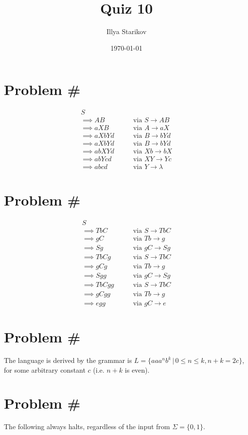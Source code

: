 \documentclass[12pt]{article}
\title{Quiz 10}
\date{\today}
\author{Illya Starikov}
\newcommand{\problem}{
    \addtocounter{section}{1}
    \section*{Problem \#\thesection}
}
\begin{document}
\maketitle

\problem
\begin{align*}
    S& \\
    \implies AB &\quad\quad \text{via $S \rightarrow AB$} \\
    \implies aXB &\quad\quad \text{via $A \rightarrow aX$} \\
    \implies aXbYd &\quad\quad \text{via $B \rightarrow bYd$} \\
    \implies aXbYd &\quad\quad \text{via $B \rightarrow bYd$} \\
    \implies abXYd &\quad\quad \text{via $Xb \rightarrow bX$} \\
    \implies abYcd &\quad\quad \text{via $XY \rightarrow Yc$} \\
    \implies abcd &\quad\quad \text{via $Y \rightarrow \lambda$}
\end{align*}

\problem
\begin{align*}
    S& \\
    \implies TbC &\quad\quad \text{via $S \rightarrow TbC$} \\
    \implies gC &\quad\quad \text{via $Tb \rightarrow g$} \\
    \implies Sg &\quad\quad \text{via $gC \rightarrow Sg$} \\
    \implies TbCg &\quad\quad \text{via $S \rightarrow TbC$} \\
    \implies gCg &\quad\quad \text{via $Tb \rightarrow g$} \\
    \implies Sgg &\quad\quad \text{via $gC \rightarrow Sg$} \\
    \implies TbCgg &\quad\quad \text{via $S \rightarrow TbC$} \\
    \implies gCgg &\quad\quad \text{via $Tb \rightarrow g$} \\
    \implies egg &\quad\quad \text{via $gC \rightarrow e$}
\end{align*}


\problem
The language is derived by the grammar is $L = \{ aa a^n b^k \, | \, 0 \leq n \leq k,  n + k = 2c \} $, for some arbitrary constant $c$ (i.e. $n + k$ is even).

\problem
The following always halts, regardless of the input from $\Sigma = \{ 0, 1 \}$.

\begin{center}
\end{center}
\end{document}

